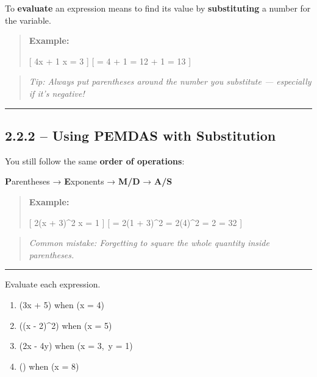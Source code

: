 \documentclass[
  letterpaper,
  DIV=11,
  numbers=noendperiod]{scrreprt}
\providecommand{\tightlist}{%
  \setlength{\itemsep}{0pt}\setlength{\parskip}{0pt}}
\begin{document}
To \textbf{evaluate} an expression means to find its value by
\textbf{substituting} a number for the variable.

\begin{quote}
\textbf{Example:}

{[} 4x + 1  x = 3 {]} {[} = 4  + 1 = 12 + 1 = 13 {]}
\end{quote}

\begin{quote}
\emph{Tip: Always put parentheses around the number you substitute ---
especially if it's negative!}
\end{quote}

\begin{center}\rule{0.5\linewidth}{0.5pt}\end{center}

\subsection*{2.2.2 -- Using PEMDAS with
Substitution}\label{using-pemdas-with-substitution}

You still follow the same \textbf{order of operations}:

\textbf{P}arentheses → \textbf{E}xponents → \textbf{M/D} → \textbf{A/S}

\begin{quote}
\textbf{Example:}

{[} 2(x + 3)\^{}2  x = 1 {]} {[} = 2(1 + 3)\^{}2 =
2(4)\^{}2 = 2  = 32 {]}
\end{quote}

\begin{quote}
\emph{Common mistake: Forgetting to square the whole quantity inside
parentheses.}
\end{quote}

\begin{center}\rule{0.5\linewidth}{0.5pt}\end{center}

Evaluate each expression.

\begin{enumerate}
\def\labelenumi{\arabic{enumi}.}
\tightlist
\item
  (3x + 5) when (x = 4)\\
\item
  ((x - 2)\^{}2) when (x = 5)\\
\item
  (2x - 4y) when (x = 3,~y = 1)\\
\item
  () when (x = 8)\\
\end{enumerate}
\end{document}

